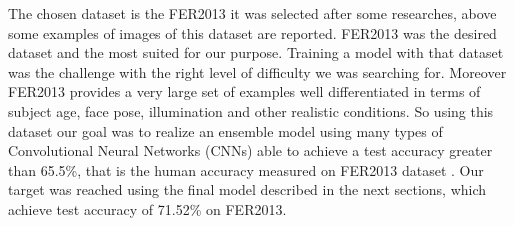 \documentclass[10pt,twocolumn,letterpaper]{article}
\begin{document}
The chosen dataset is the FER2013 it was selected after some researches, above some examples of images of this dataset are reported. FER2013 was the desired dataset and the most suited for our purpose. Training a model with that dataset was the challenge with the right level of difficulty we was searching for. Moreover FER2013 provides a very large set of examples well differentiated in terms of subject age, face pose, illumination and other realistic conditions. So using this dataset our goal was to realize an ensemble model using many types of Convolutional Neural Networks (CNNs) able to achieve a test accuracy greater than 65.5\%, that is the human accuracy measured on FER2013 dataset \cite{3}. Our target was reached using the final model described in the next sections, which achieve test accuracy of 71.52\% on FER2013.
\end{document}
